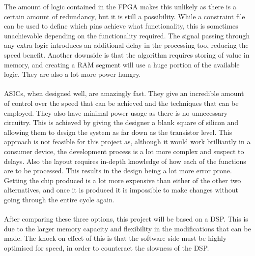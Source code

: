 The amount of logic contained in the FPGA makes this unlikely as there is a certain amount of redundancy, but it is still a possibility.
While a constraint file can be used to define which pins achieve what functionality, this is sometimes unachievable depending on the functionality required.
The signal passing through any extra logic introduces an additional delay in the processing too, reducing the speed benefit.
Another downside is that the algorithm requires storing of value in memory, and creating a RAM segment will use a huge portion of the available logic.
They are also a lot more power hungry.
\\
\\
ASICs, when designed well, are amazingly fast.
They give an incredible amount of control over the speed that can be achieved and the techniques that can be employed.
They also have minimal power usage as there is no unnecessary circuitry.
This is achieved by giving the designer a blank square of silicon and allowing them to design the system as far down as the transistor level.
This approach is not feasible for this project as, although it would work brilliantly in a consumer device, the development process is a lot more complex and suspect to delays.
Also the layout requires in-depth knowledge of how each of the functions are to be processed.
This results in the design being a lot more error prone.
Getting the chip produced is a lot more expensive than either of the other two alternatives, and once it is produced it is impossible to make changes without going through the entire cycle again.
\\
\\
After comparing these three options, this project will be based on a DSP.
This is due to the larger memory capacity and flexibility in the modifications that can be made.
The knock-on effect of this is that the software side must be highly optimised for speed, in order to counteract the slowness of the DSP. 
